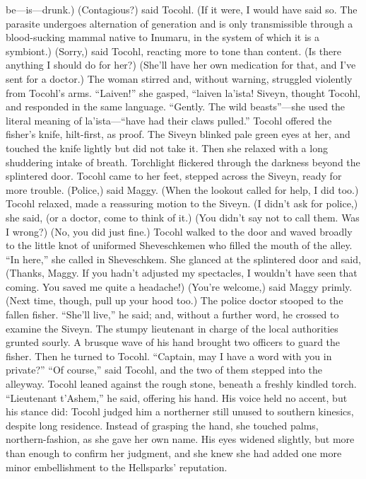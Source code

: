 \documentclass[9pt]{article}
\begin{document}
be—is—drunk.)
(Contagious?) said Tocohl.
(If it were, I would have said so. The parasite undergoes alternation of generation and is only
transmissible through a blood-sucking mammal native to Inumaru, in the system of which it is a symbiont.)
(Sorry,) said Tocohl, reacting more to tone than content. (Is there anything I should do for her?)
(She’ll have her own medication for that, and I’ve sent for a doctor.)
The woman stirred and, without warning, struggled violently from Tocohl’s arms. “Laiven!” she
gasped, “laiven la’ista!
Siveyn, thought Tocohl, and responded in the same language. “Gently. The wild beasts”—she used
the literal meaning of la’ista—“have had their claws pulled.” Tocohl offered the fisher’s knife, hilt-first, as
proof.
The Siveyn blinked pale green eyes at her, and touched the knife lightly but did not take it. Then she
relaxed with a long shuddering intake of breath.
Torchlight flickered through the darkness beyond the splintered door. Tocohl came to her feet,
stepped across the Siveyn, ready for more trouble.
(Police,) said Maggy. (When the lookout called for help, I did too.)
Tocohl relaxed, made a reassuring motion to the Siveyn. (I didn’t ask for police,) she said, (or a
doctor, come to think of it.)
(You didn’t say not to call them. Was I wrong?)
(No, you did just fine.) Tocohl walked to the door and waved broadly to the little knot of uniformed
Sheveschkemen who filled the mouth of the alley. “In here,” she called in Sheveschkem.
She glanced at the splintered door and said, (Thanks, Maggy. If you hadn’t adjusted my spectacles, I
wouldn’t have seen that coming. You saved me quite a headache!)
(You’re welcome,) said Maggy primly. (Next time, though, pull up your hood too.)
The police doctor stooped to the fallen fisher. “She’ll live,” he said; and, without a further word, he
crossed to examine the Siveyn.
The stumpy lieutenant in charge of the local authorities grunted sourly. A brusque wave of his hand
brought two officers to guard the fisher. Then he turned to Tocohl. “Captain, may I have a word with you
in private?”
“Of course,” said Tocohl, and the two of them stepped into the alleyway. Tocohl leaned against the
rough stone, beneath a freshly kindled torch.
“Lieutenant t’Ashem,” he said, offering his hand.
His voice held no accent, but his stance did: Tocohl judged him a northerner still unused to southern
kinesics, despite long residence. Instead of grasping the hand, she touched palms, northern-fashion, as
she gave her own name. His eyes widened slightly, but more than enough to confirm her judgment, and
she knew she had added one more minor embellishment to the Hellsparks’ reputation.
\end{document}
